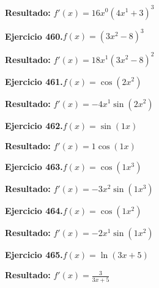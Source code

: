 \documentclass[10pt,a4paper]{article}
\begin{document}
\begin{solbox}
\textbf{Resultado:} \(\displaystyle f'(x) = 16x^{0}(4x^{1} +3)^{3}\)
\end{solbox}

\newpage
\begin{ejbox}
\textbf{Ejercicio 460.}\quad $f(x) = (3x^{2} -8)^{3}$
\end{ejbox}

\begin{solbox}
\textbf{Resultado:} \(\displaystyle f'(x) = 18x^{1}(3x^{2} -8)^{2}\)
\end{solbox}

\begin{ejbox}
\textbf{Ejercicio 461.}\quad $f(x) = \cos(2x^{2})$
\end{ejbox}

\begin{solbox}
\textbf{Resultado:} \(\displaystyle f'(x) = -4x^{1}\sin(2x^{2})\)
\end{solbox}

\begin{ejbox}
\textbf{Ejercicio 462.}\quad $f(x) = \sin(1x)$
\end{ejbox}

\begin{solbox}
\textbf{Resultado:} \(\displaystyle f'(x) = 1\cos(1x)\)
\end{solbox}

\newpage
\begin{ejbox}
\textbf{Ejercicio 463.}\quad $f(x) = \cos(1x^{3})$
\end{ejbox}

\begin{solbox}
\textbf{Resultado:} \(\displaystyle f'(x) = -3x^{2}\sin(1x^{3})\)
\end{solbox}

\begin{ejbox}
\textbf{Ejercicio 464.}\quad $f(x) = \cos(1x^{2})$
\end{ejbox}

\begin{solbox}
\textbf{Resultado:} \(\displaystyle f'(x) = -2x^{1}\sin(1x^{2})\)
\end{solbox}

\begin{ejbox}
\textbf{Ejercicio 465.}\quad $f(x) = \ln(3x + 5)$
\end{ejbox}

\begin{solbox}
\textbf{Resultado:} \(\displaystyle f'(x) = \frac{3}{3x + 5}\)
\end{solbox}
\end{document}
